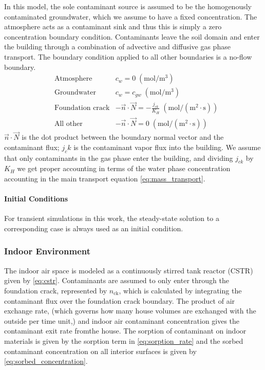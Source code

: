 In this model, the sole contaminant source is assumed to be the homogenously contaminated groundwater, which we assume to have a fixed concentration.
The atmosphere acts as a contaminant sink and thus this is simply a zero concentration boundary condition.
Contaminants leave the soil domain and enter the building through a combination of advective and diffusive gas phase transport.
The boundary condition applied to all other boundaries is a no-flow boundary.
\begin{align}
  &\text{Atmosphere} & c_w = 0 \; \mathrm{(mol/m^3)} \\
  &\text{Groundwater} & c_w = c_{gw} \; \mathrm{(mol/m^3)} \\
  &\text{Foundation crack} & -\vec{n} \cdot \vec{N} = - \frac{j_{ck}}{K_H} \; \mathrm{(mol/(m^2 \cdot s))}\\
  &\text{All other} & -\vec{n} \cdot \vec{N} = 0 \; \mathrm{(mol/(m^2 \cdot s))}
\end{align}
$\vec{n} \cdot \vec{N}$ is the dot product between the boundary normal vector and the contaminant flux;
$j_ck$ is the contaminant vapor flux into the building.
We assume that only contaminants in the gas phase enter the building, and dividing $j_{ck}$ by $K_H$ we get proper accounting in terms of the water phase concentration accounting in the main transport equation \ref{eq:mass_transport}.\par

\paragraph{Initial Conditions}

For transient simulations in this work, the steady-state solution to a corresponding case is always used as an initial condition.

\subsubsection{Indoor Environment}\label{sec:indoor_environment}

The indoor air space is modeled as a continuously stirred tank reactor (CSTR) given by \eqref{eq:cstr}.
Contaminants are assumed to only enter through the foundation crack, represented by $n_\mathrm{ck}$, which is calculated by integrating the contaminant flux over the foundation crack boundary.
The product of air exchange rate, (which governs how many house volumes are exchanged with the outside per time unit,) and indoor air contaminant concentration gives the contaminant exit rate fromthe house.
The sorption of contaminant on indoor materials is given by the sorption term in \eqref{eq:sorption_rate} and the sorbed contaminant concentration on all interior surfaces is given by \eqref{eq:sorbed_concentration}.

